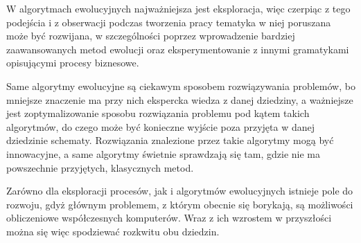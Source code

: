 W algorytmach ewolucyjnych najważniejsza jest eksploracja, więc czerpiąc z tego podejścia i z obserwacji podczas tworzenia pracy tematyka w niej poruszana może być rozwijana, w szczególności poprzez wprowadzenie bardziej zaawansowanych metod ewolucji oraz eksperymentowanie z innymi gramatykami opisującymi procesy biznesowe. 

Same algorytmy ewolucyjne są ciekawym sposobem rozwiązywania problemów, bo mniejsze znaczenie ma przy nich ekspercka wiedza z danej dziedziny, a ważniejsze jest zoptymalizowanie sposobu rozwiązania problemu pod kątem takich algorytmów, do czego może być konieczne wyjście poza przyjęta w danej dziedzinie schematy. Rozwiązania znalezione przez takie algorytmy mogą być innowacyjne, a same algorytmy świetnie sprawdzają się tam, gdzie nie ma powszechnie przyjętych, klasycznych metod. 

Zarówno dla eksploracji procesów, jak i algorytmów ewolucyjnych istnieje pole do rozwoju, gdyż głównym problemem, z którym obecnie się borykają, są możliwości obliczeniowe współczesnych komputerów. Wraz z ich wzrostem w przyszłości można się więc spodziewać rozkwitu obu dziedzin. 


